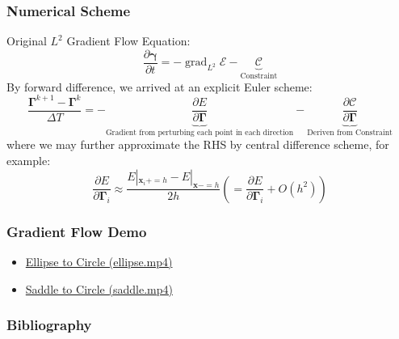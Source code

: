 \documentclass{beamer}
\theoremstyle{remark}
\newcommand{\gammabf}{\boldsymbol{\gamma}}
\newcommand{\Gammabf}{\boldsymbol{\Gamma}}
\newcommand{\xbf}{\mathbf{x}}
\DeclareMathOperator{\grad}{grad}
\begin{document}
\begin{frame}
    \frametitle{Numerical Scheme}
    Original $L^2$ Gradient Flow Equation:
    \begin{equation}
        \frac{\partial \gammabf}{\partial t} = - \grad_{L^2} \mathcal{E} - \underbrace{\mathcal{C}}_{\text{Constraint}}
    \end{equation}
    By forward difference, we arrived at an explicit Euler scheme:
    \begin{equation*}
        \frac{\Gammabf^{k+1} - \Gammabf^k}{\Delta T} = - \underbrace{\frac{\partial E}{\partial \Gammabf}}_{\text{Gradient from perturbing each point in each direction}}
        - \underbrace{\frac{\partial \mathcal{C}}{\partial \Gammabf}}_{\text{Deriven from Constraint}}
    \end{equation*}
    where we may further approximate the RHS by central difference scheme, for example:
    \begin{equation*}
        \frac{\partial E}{\partial \Gammabf_i} \approx \frac{E|_{\xbf_i += h} - E|_{\xbf -= h}}{2h} \left(= \frac{\partial E}{\partial \Gammabf_i} + O(h^2) \right) 
    \end{equation*}
\end{frame}

\begin{frame}
    \frametitle{Gradient Flow Demo}
    \begin{itemize}
        \item \href{run:./demos/ellipse.mp4}{Ellipse to Circle (ellipse.mp4)}
        \item \href{run:./demos/saddle.mp4}{Saddle to Circle (saddle.mp4)}
    \end{itemize}
\end{frame}

\begin{frame}
    \frametitle{Bibliography}
    \printbibliography
\end{frame}
\end{document}

